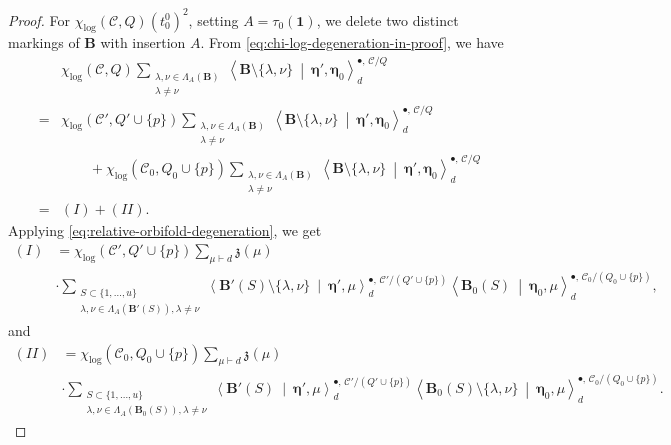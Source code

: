 \documentclass[letterpaper,12pt]{amsart}
\theoremstyle{definition}
\newcommand{\id}{\mathbf 1}
\newcommand{\cC}{\mathcal C}
\numberwithin{equation}{section}
\begin{document}
\begin{proof}
For \(\chi_{\log}(\cC,Q)(t^0_0)^2\), setting \(A=\tau_0(\id)\), we delete two distinct markings of \(\mathbf B\) with insertion
\(A\).  From \eqref{eq:chi-log-degeneration-in-proof}, we have
\begin{align*}
    &\chi_{\log}(\cC,Q)
 \sum_{\substack{\lambda,\nu\in\Lambda_A(\mathbf B)\\ \lambda\ne\nu}}
 \left\langle\mathbf B\setminus\{\lambda,\nu\}
 \ \middle|\ \boldsymbol\eta',\boldsymbol\eta_0\right\rangle_d^{\bullet,\,\cC/Q}\\
 ={}&\chi_{\log}(\cC',Q'\cup\{p\})
 \sum_{\substack{\lambda,\nu\in\Lambda_A(\mathbf B)\\ \lambda\ne\nu}}
 \left\langle\mathbf B\setminus\{\lambda,\nu\}
 \ \middle|\ \boldsymbol\eta',\boldsymbol\eta_0\right\rangle_d^{\bullet,\,\cC/Q}\\
 &\qquad+\chi_{\log}(\cC_0,Q_0\cup\{p\})
 \sum_{\substack{\lambda,\nu\in\Lambda_A(\mathbf B)\\ \lambda\ne\nu}}
 \left\langle\mathbf B\setminus\{\lambda,\nu\}
 \ \middle|\ \boldsymbol\eta',\boldsymbol\eta_0\right\rangle_d^{\bullet,\,\cC/Q}\\
 ={}&(I)+(II).
\end{align*}
Applying \eqref{eq:relative-orbifold-degeneration}, we get
\begin{align*}
    (I)&=\chi_{\log}(\cC',Q'\cup\{p\})\sum_{\mu\vdash d}\mathfrak z(\mu)\\
    &\cdot\sum_{\substack{S\subset\{1,\ldots,u\}\\\lambda,\nu\in\Lambda_A(\mathbf B'(S)), \lambda\ne\nu}}
 \left\langle\mathbf B'(S)\setminus\{\lambda,\nu\}
 \ \middle|\ \boldsymbol\eta',\mu\right\rangle_d^{\bullet,\,\cC'/(Q'\cup\{p\})}
 \left\langle\mathbf B_0(S)\ \middle|\ \boldsymbol\eta_0,\mu\right\rangle_d^{\bullet,\,\cC_0/(Q_0\cup\{p\})},
\end{align*}
and 
\begin{align*}
    (II)&=\chi_{\log}(\cC_0,Q_0\cup\{p\})\sum_{\mu\vdash d}\mathfrak z(\mu)\\
    &\cdot\sum_{\substack{S\subset\{1,\ldots,u\}\\\lambda,\nu\in\Lambda_A(\mathbf B_0(S)), \lambda\ne\nu}}
 \left\langle\mathbf B'(S)
 \ \middle|\ \boldsymbol\eta',\mu\right\rangle_d^{\bullet,\,\cC'/(Q'\cup\{p\})}
 \left\langle\mathbf B_0(S)\setminus\{\lambda,\nu\}\ \middle|\ \boldsymbol\eta_0,\mu\right\rangle_d^{\bullet,\,\cC_0/(Q_0\cup\{p\})}.
\end{align*}


\end{proof}
\end{document}
